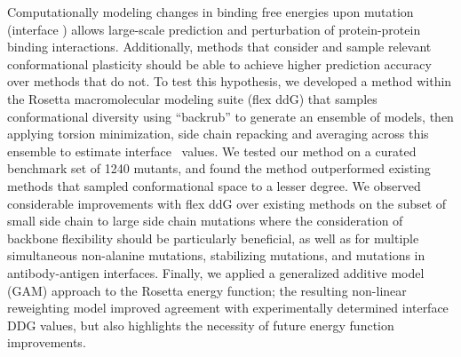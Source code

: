 Computationally modeling changes in binding free energies upon mutation (interface \ddg) allows large-scale prediction and perturbation of protein-protein binding interactions.
Additionally, methods that consider and sample relevant conformational plasticity should be able to achieve higher prediction accuracy over methods that do not.
To test this hypothesis, we developed a method within the Rosetta macromolecular modeling suite (flex ddG) that samples conformational diversity using ``backrub'' to generate an ensemble of models, then applying torsion minimization, side chain repacking and averaging across this ensemble to estimate interface \ddg\ values.
We tested our method on a curated benchmark set of 1240 mutants, and found the method outperformed existing methods that sampled conformational space to a lesser degree.
We observed considerable improvements with flex ddG over existing methods on the subset of small side chain to large side chain mutations where the consideration of backbone flexibility should be particularly beneficial, as well as for multiple simultaneous non-alanine mutations, stabilizing mutations, and mutations in antibody-antigen interfaces.
Finally, we applied a generalized additive model (GAM) approach to the Rosetta energy function; the resulting non-linear reweighting model improved agreement with experimentally determined interface DDG values, but also highlights the necessity of future energy function improvements.
